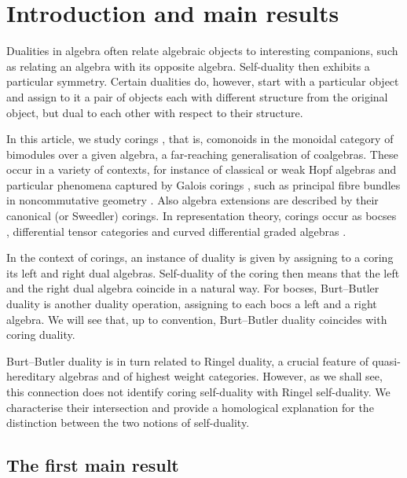 \documentclass[12pt,a4paper]{amsart}
\theoremstyle{plain}
\theoremstyle{definition}
\numberwithin{equation}{thm}
\begin{document}
\maketitle

\section{Introduction and main results}

Dualities in algebra often relate algebraic objects to interesting
companions, such as relating an algebra with its opposite algebra. Self-duality then exhibits a particular symmetry.
Certain dualities do, however, start with a particular object and assign
to it a pair of objects each with different structure from the original object,
but dual to each other with respect to their structure. 

In this article, we study corings \cite{Swe75}, that is, comonoids in the monoidal category of bimodules over a given algebra, a far-reaching generalisation of coalgebras. These occur in a variety
of contexts, for instance of classical 
or weak Hopf algebras \cite{BNS99} and
particular phenomena captured by Galois corings \cite{Brz05}, such as principal fibre bundles in noncommutative geometry \cite{BM93}. Also algebra extensions are described
by their canonical (or Sweedler) corings. In representation theory, corings occur as
bocses \cite{Roi79}, differential tensor categories \cite{BSZ09} and curved differential graded algebras \cite{Brz13}.

In the context of corings, an instance of duality is given by assigning to a coring its left and right dual algebras. Self-duality of the coring then means that the left and the
right dual algebra coincide in a natural way.
 For bocses, Burt--Butler duality is another
duality operation, assigning to each bocs a left and a right algebra. We 
will see that, up to convention, Burt--Butler
duality  coincides with coring duality.

Burt--Butler duality is in turn related to Ringel duality, a
crucial feature of quasi-hereditary algebras and of highest weight
categories. However, as we shall see, this connection does not identify coring self-duality with Ringel self-duality. We characterise their intersection and provide a homological explanation for the distinction between the two notions of self-duality.

\subsection*{The first main result}
\end{document}
